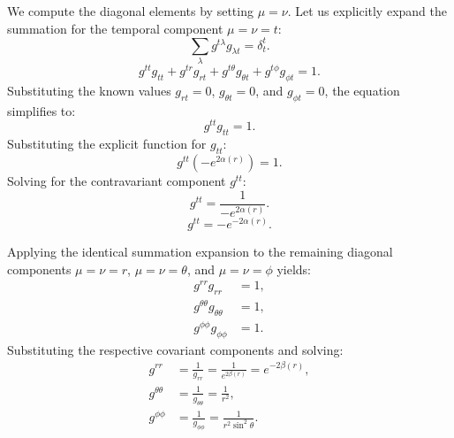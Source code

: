 \documentclass[11pt, a4paper]{report}
\begin{document}
We compute the diagonal elements by setting $\mu = \nu$. Let us explicitly expand the summation for the temporal component $\mu = \nu = t$:
\begin{equation}
\sum_{\lambda} g^{t\lambda} g_{\lambda t} = \delta^t_t.
\end{equation}
\begin{equation}
g^{tt} g_{tt} + g^{tr} g_{rt} + g^{t\theta} g_{\theta t} + g^{t\phi} g_{\phi t} = 1.
\end{equation}
Substituting the known values $g_{rt} = 0$, $g_{\theta t} = 0$, and $g_{\phi t} = 0$, the equation simplifies to:
\begin{equation}
g^{tt} g_{tt} = 1.
\end{equation}
Substituting the explicit function for $g_{tt}$:
\begin{equation}
g^{tt} \left( -e^{2\alpha(r)} \right) = 1.
\end{equation}
Solving for the contravariant component $g^{tt}$:
\begin{equation}
g^{tt} = \frac{1}{-e^{2\alpha(r)}}.
\end{equation}
\begin{equation}
g^{tt} = -e^{-2\alpha(r)}.
\end{equation}

Applying the identical summation expansion to the remaining diagonal components $\mu = \nu = r$, $\mu = \nu = \theta$, and $\mu = \nu = \phi$ yields:
\begin{align}
g^{rr} g_{rr} &= 1, \\
g^{\theta\theta} g_{\theta\theta} &= 1, \\
g^{\phi\phi} g_{\phi\phi} &= 1.
\end{align}
Substituting the respective covariant components and solving:
\begin{align}
g^{rr} &= \frac{1}{g_{rr}} = \frac{1}{e^{2\beta(r)}} = e^{-2\beta(r)}, \\
g^{\theta\theta} &= \frac{1}{g_{\theta\theta}} = \frac{1}{r^2}, \\
g^{\phi\phi} &= \frac{1}{g_{\phi\phi}} = \frac{1}{r^2 \sin^2\theta}.
\end{align}
\end{document}
